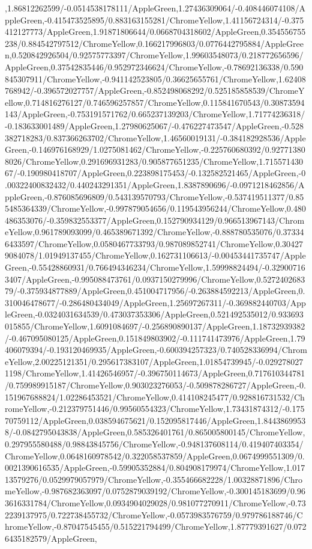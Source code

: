 {\begin{tikzternal}
,1.86812262599/-0.0514538178111/AppleGreen,1.27436309064/-0.408446074108/AppleGreen,-0.415473525895/0.883163155281/ChromeYellow,1.41156724314/-0.375412127773/AppleGreen,1.91871806644/0.0668704318602/AppleGreen,0.354556755238/0.884542797512/ChromeYellow,0.166217996803/0.0776442795884/AppleGreen,0.520842926504/0.92575773397/ChromeYellow,1.99603548073/0.218772656596/AppleGreen,0.37542835446/0.952972346624/ChromeYellow,-0.78692136338/0.590845307911/ChromeYellow,-0.941142523805/0.36625655761/ChromeYellow,1.62408768942/-0.396572027757/AppleGreen,-0.852498068292/0.525185858539/ChromeYellow,0.714816276127/0.746596257857/ChromeYellow,0.115841670543/0.30873594143/AppleGreen,-0.753191571762/0.665237139203/ChromeYellow,1.71774236318/-0.183633001489/AppleGreen,1.27980625067/-0.476227473547/AppleGreen,-0.528382718283/0.837366263702/ChromeYellow,1.46560019131/-0.384182928536/AppleGreen,-0.146976168929/1.0275081462/ChromeYellow,-0.225760680392/0.927713808026/ChromeYellow,0.291696931283/0.905877651235/ChromeYellow,1.71557143067/-0.190980418707/AppleGreen,0.223898175453/-0.132582521465/AppleGreen,-0.00322400832432/0.440243291351/AppleGreen,1.8387890696/-0.0971218462856/AppleGreen,-0.876085696809/0.543139570793/ChromeYellow,-0.537419511377/0.855485364339/ChromeYellow,-0.997879054656/0.119543956244/ChromeYellow,0.480486353076/-0.359832553377/AppleGreen,0.152790934129/0.966513967143/ChromeYellow,0.961789093099/0.465389671392/ChromeYellow,-0.888780535076/0.373346433597/ChromeYellow,0.0580467733793/0.987089852741/ChromeYellow,0.304279084078/1.01949137455/ChromeYellow,0.162731106613/-0.00453441735747/AppleGreen,-0.55428860931/0.766494346234/ChromeYellow,1.59998824494/-0.329007163407/AppleGreen,-0.995088473761/0.0937150279996/ChromeYellow,0.527240268379/-0.375934877889/AppleGreen,0.451004717956/-0.263884592213/AppleGreen,0.310046478677/-0.286480434049/AppleGreen,1.25697267311/-0.369882440703/AppleGreen,-0.0324031634539/0.473037353306/AppleGreen,0.521492535012/0.933693015855/ChromeYellow,1.6091084697/-0.256890890137/AppleGreen,1.18732939382/-0.467095080125/AppleGreen,0.151849803902/-0.111741473976/AppleGreen,1.79406079394/-0.193120469935/AppleGreen,-0.600394257323/0.740528336994/ChromeYellow,2.00225121351/0.295617383107/AppleGreen,1.01854739945/-0.0292780271198/ChromeYellow,1.41426546957/-0.396750114673/AppleGreen,0.717610344781/0.759989915187/ChromeYellow,0.903023276053/-0.509878286727/AppleGreen,-0.151967688824/1.02286453521/ChromeYellow,0.414108245477/0.928816731532/ChromeYellow,-0.212379751446/0.99560554323/ChromeYellow,1.73431874312/-0.17570759112/AppleGreen,0.038594675621/0.152095817446/AppleGreen,1.84438699538/-0.0842795043838/AppleGreen,0.585326401761/0.865005800145/ChromeYellow,0.297955580488/0.98843845756/ChromeYellow,-0.948137608114/0.419407403354/ChromeYellow,0.0648160978542/0.322058537859/AppleGreen,0.0674999551309/0.0021390616535/AppleGreen,-0.59905352884/0.804908179974/ChromeYellow,1.01713579276/0.0529979057979/ChromeYellow,-0.355466682228/1.00328871896/ChromeYellow,-0.987682363097/0.0752879039192/ChromeYellow,-0.300145183699/0.963616331784/ChromeYellow,0.0934904029028/0.981077270911/ChromeYellow,-0.732239137975/0.722738455732/ChromeYellow,-0.0573983576759/0.979786188746/ChromeYellow,-0.87047545455/0.515221794499/ChromeYellow,1.87779391627/0.0726435182579/AppleGreen,
\end{tikzternal}}
